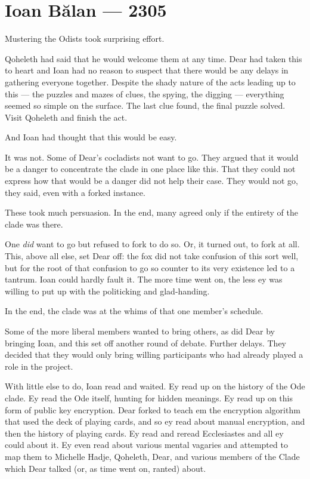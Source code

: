 \hypertarget{ioan-bux103lan-2305}{%
\chapter*{Ioan Bălan — 2305}\label{ioan-bux103lan-2305}}

Mustering the Odists took surprising effort.

Qoheleth had said that he would welcome them at any time. Dear had taken this to heart and Ioan had no reason to suspect that there would be any delays in gathering everyone together. Despite the shady nature of the acts leading up to this — the puzzles and mazes of clues, the spying, the digging — everything seemed so simple on the surface. The last clue found, the final puzzle solved. Visit Qoheleth and finish the act.

And Ioan had thought that this would be easy.

It was not. Some of Dear's cocladists not want to go. They argued that it would be a danger to concentrate the clade in one place like this. That they could not express how that would be a danger did not help their case. They would not go, they said, even with a forked instance.

These took much persuasion. In the end, many agreed only if the entirety of the clade was there.

One \emph{did} want to go but refused to fork to do so. Or, it turned out, to fork at all. This, above all else, set Dear off: the fox did not take confusion of this sort well, but for the root of that confusion to go so counter to its very existence led to a tantrum. Ioan could hardly fault it. The more time went on, the less ey was willing to put up with the politicking and glad-handing.

In the end, the clade was at the whims of that one member's schedule.

Some of the more liberal members wanted to bring others, as did Dear by bringing Ioan, and this set off another round of debate. Further delays. They decided that they would only bring willing participants who had already played a role in the project.

With little else to do, Ioan read and waited. Ey read up on the history of the Ode clade. Ey read the Ode itself, hunting for hidden meanings. Ey read up on this form of public key encryption. Dear forked to teach em the encryption algorithm that used the deck of playing cards, and so ey read about manual encryption, and then the history of playing cards. Ey read and reread Ecclesiastes and all ey could about it. Ey even read about various mental vagaries and attempted to map them to Michelle Hadje, Qoheleth, Dear, and various members of the Clade which Dear talked (or, as time went on, ranted) about.

